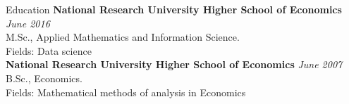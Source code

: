 \documentclass{resume} %
\begin{document}
\begin{rSection}{Education}
{\bf National Research University Higher School of Economics} \hfill {\em June 2016} \\
M.Sc., Applied Mathematics and Information Science. \\
Fields: Data science \smallskip \\
{\bf National Research University Higher School of Economics} \hfill {\em June 2007} \\ 
B.Sc., Economics. \\
Fields: Mathematical methods of analysis in Economics \\
\end{rSection}
\end{document}
